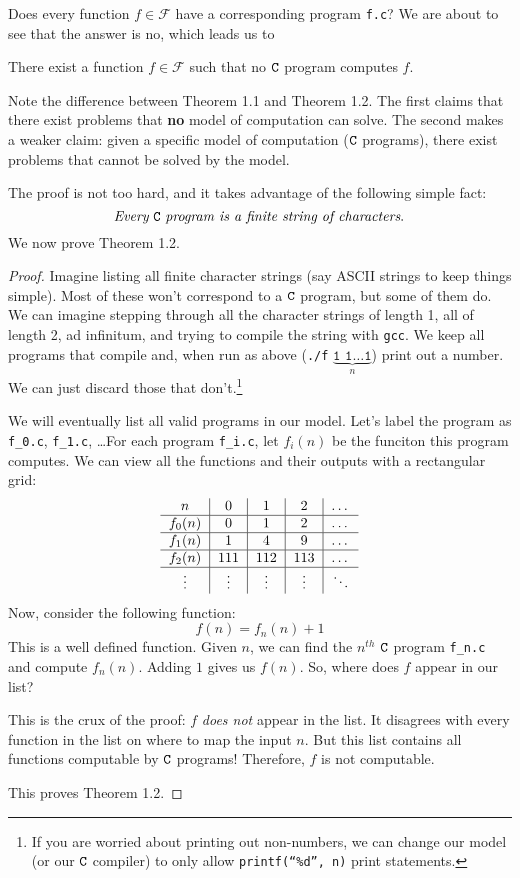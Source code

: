 \documentclass[english, 12pt]{article}
\begin{document}
  Does every function $f \in \mathcal{F}$ have a corresponding program 
  \texttt{f.c}? We are about to see that the answer is no, which leads us
  to
  \begin{thrm} There exist a function $f \in \mathcal{F}$ such that no
               ${\texttt{C}}$ program computes $f$.
  \end{thrm}
  Note the difference between Theorem 1.1 and Theorem 1.2. The first claims
  that there exist problems that {\bf no} model of computation can solve. The
  second makes a weaker claim: given a specific model of computation (${\texttt{C}}$ 
  programs), there exist problems that cannot be solved by the model.

  The proof is not too hard, and it takes advantage of the following simple
  fact:\[\text{ 
  {\it Every} ${\texttt{C}}$ {\it program is a finite string of characters}.
  }\]
  We now prove Theorem 1.2.
  \begin{proof}
  Imagine listing {all finite character strings} (say ASCII strings to 
  keep things simple). Most of these won't correspond to a ${\texttt{C}}$ program,
  but some of them do. We can imagine stepping through all the character 
  strings of length 1, all of length 2, ad infinitum, and trying to compile
  the string with \texttt{gcc}. We keep all programs that compile and,
  when run as above 
  (\texttt{./f} $\underbrace{\texttt{1 1}\dots\texttt{1}}_{n}$) print out
  a number. We can just discard those that don't.\footnote{If you are worried
  about printing out non-numbers, we can change our model (or our 
  ${\texttt{C}}$ compiler) to only allow \texttt{printf(``\%d'', n)} print
  statements.} \n

  We will eventually list all valid programs in our model. Let's label
  the program as \texttt{f\_0.c}, \texttt{f\_1.c}, \dots For each program
  \texttt{f\_i.c}, let $f_i(n)$ be the funciton this program computes.
  We can view all the functions and their outputs with a rectangular grid:
\[
\begin{tabular}{c|c|c|c|c}
$n$             & $0$   & $1$   & $2$   & \dots \\
\hline
$f_0(n)$ & $0$   & $1$   & $2$   & \dots \\
\hline
$f_1(n)$ & $1$   & $4$   & $9$   & \dots \\
\hline
$f_2(n)$ & $111$ & $112$ & $113$ & \dots \\
\hline
\vdots & \vdots & \vdots & \vdots & $\ddots$
\end{tabular}
\]
  Now, consider the following function:
  \[ f(n) = f_n(n) + 1 \]
  This is a well defined function. Given $n$, we can find the $n^{th}$ ${\texttt{C}}$
  program \texttt{f\_n.c} and compute $f_n(n)$. Adding \(1\) gives us $f(n)$.
  So, where does $f$ appear in our list?\n

  This is the crux of the proof: $f$ {\it does not} appear in the list. 
  It disagrees with every function in the list on where to map the input
  $n$. But this list contains all functions computable by ${\texttt{C}}$ programs! 
  Therefore, $f$ is not computable.\n

  This proves Theorem 1.2.
  \end{proof}
\end{document}
